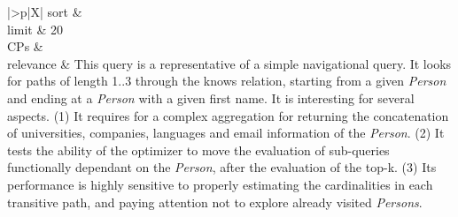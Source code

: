 \begin{tabularx}{\queryCardWidth}{|>{\queryPropertyCell}p{\queryPropertyCellWidth}|X|}
		sort		&
		\innerCardVSpace \\ \hline
	limit & 20 \\ \hline
	CPs &
	 \\ \hline
	relevance &
		\footnotesize This query is a representative of a simple navigational query. It looks
for paths of length 1..3 through the knows relation, starting from a
given \emph{Person} and ending at a \emph{Person} with a given first
name. It is interesting for several aspects. (1) It requires for a
complex aggregation for returning the concatenation of universities,
companies, languages and email information of the \emph{Person}. (2) It
tests the ability of the optimizer to move the evaluation of sub-queries
functionally dependant on the \emph{Person}, after the evaluation of the
top-k. (3) Its performance is highly sensitive to properly estimating
the cardinalities in each transitive path, and paying attention not to
explore already visited \emph{Persons}.
 \\ \hline%
\end{tabularx}
\queryCardVSpace

\let\emph\oldemph